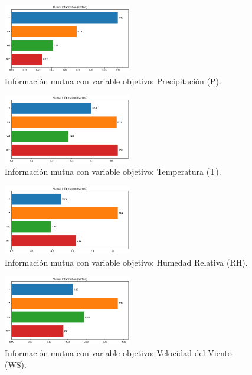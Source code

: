 \begin{figure}[H]
    \centering
    \includegraphics[width=0.5\textwidth]{resultados/global/bivariado/mutual_info_P.png}
    \caption{Información mutua con variable objetivo: Precipitación (P).}
    \label{fig:mutual_info_P}
\end{figure}

\begin{figure}[H]
    \centering
    \includegraphics[width=0.5\textwidth]{resultados/global/bivariado/mutual_info_T.png}
    \caption{Información mutua con variable objetivo: Temperatura (T).}
    \label{fig:mutual_info_T}
\end{figure}

\begin{figure}[H]
    \centering
    \includegraphics[width=0.5\textwidth]{resultados/global/bivariado/mutual_info_RH.png}
    \caption{Información mutua con variable objetivo: Humedad Relativa (RH).}
    \label{fig:mutual_info_RH}
\end{figure}

\begin{figure}[H]
    \centering
    \includegraphics[width=0.5\textwidth]{resultados/global/bivariado/mutual_info_WS.png}
    \caption{Información mutua con variable objetivo: Velocidad del Viento (WS).}
    \label{fig:mutual_info_WS}
\end{figure}

